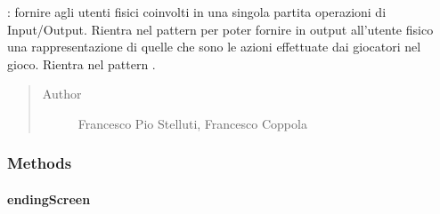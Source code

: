 \documentclass[letterpaper,10pt,italian,openany,oneside]{sphinxmanual}
\begin{document}
\begin{fulllineitems}
\label{\detokenize{source/it/unicam/cs/pa/mastermind/ui/GameView:it.unicam.cs.pa.mastermind.ui.GameView}}
: fornire agli utenti fisici coinvolti in una singola partita operazioni di Input/Output. Rientra nel pattern  per poter fornire in output all’utente fisico una rappresentazione di quelle che sono le azioni effettuate dai giocatori nel gioco. Rientra nel pattern .
\begin{quote}\begin{description}
\item[{Author}] \leavevmode
Francesco Pio Stelluti, Francesco Coppola

\end{description}\end{quote}

\end{fulllineitems}



\subsubsection{Methods}
\label{\detokenize{source/it/unicam/cs/pa/mastermind/ui/GameView:methods}}

\paragraph{endingScreen}
\label{\detokenize{source/it/unicam/cs/pa/mastermind/ui/GameView:endingscreen}}
\end{document}
